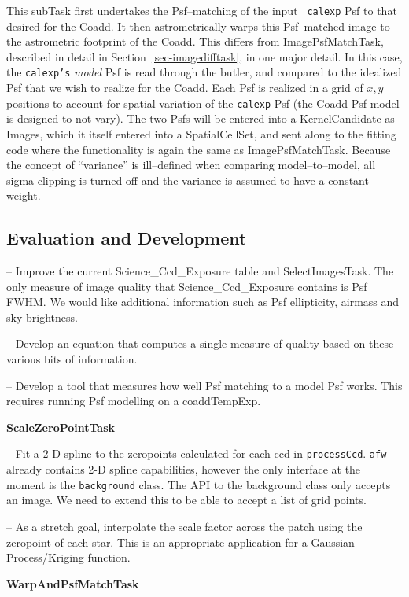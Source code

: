 \documentclass[12pt]{article}
\begin{document}
This subTask first undertakes the Psf--matching of the input {\tt
  calexp} Psf to that desired for the Coadd.  It then astrometrically
warps this Psf--matched image to the astrometric footprint of the
Coadd.  This differs from ImagePsfMatchTask, described in detail in
Section~\ref{sec-imagedifftask}, in one major detail.  In this case,
the {\tt calexp's} {\it model} Psf is read through the butler, and
compared to the idealized Psf that we wish to realize for the Coadd.
Each Psf is realized in a grid of $x,y$ positions to account for
spatial variation of the {\tt calexp} Psf (the Coadd Psf model is
designed to not vary).  The two Psfs will be entered into a
KernelCandidate as Images, which it itself entered into a
SpatialCellSet, and sent along to the fitting code where the
functionality is again the same as ImagePsfMatchTask.  Because the
concept of ``variance'' is ill--defined when comparing
model--to--model, all sigma clipping is turned off and the variance is
assumed to have a constant weight.


\subsection{Evaluation and Development}

-- Improve the current Science\_Ccd\_Exposure table and SelectImagesTask.
The only measure of image quality that Science\_Ccd\_Exposure contains is Psf FWHM.
We would like additional information such as Psf ellipticity, airmass and sky brightness.

-- Develop an equation that computes a single measure of quality
based on these various bits of information.

-- Develop a tool that measures how well Psf matching to a model Psf
works. This requires running Psf modelling on a coaddTempExp.


{\bf ScaleZeroPointTask}

--  Fit a 2-D spline to the zeropoints calculated for each ccd in {\tt processCcd}.   {\tt afw} already contains 2-D spline capabilities, however the only interface at the moment is the {\tt background} class. The API to the background class only accepts an image. We need to extend this  to be able to accept a list of grid points.   

-- As a stretch goal, interpolate the scale factor across the patch using the zeropoint of each star. This is an appropriate application for a Gaussian Process/Kriging function. 

{\bf WarpAndPsfMatchTask}
\end{document}
